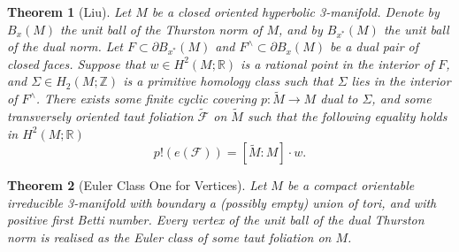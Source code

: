\documentclass[10pt,a4paper]{amsart}
\newtheorem{thm}{Theorem}
\begin{document}
	\begin{thm}[Liu]
		Let $M$ be a closed oriented hyperbolic 3-manifold. Denote by $B_x(M)$ the unit ball of the Thurston norm of $M$, and by $B_{x^*}(M)$ the unit ball of the dual norm. Let $F \subset \partial B_{x^*}(M)$ and $F^\wedge \subset \partial B_x(M)$ be a dual pair of closed faces.  Suppose that $w \in H^2(M ; \mathbb{R})$ is a rational point in the interior of $F$, and $\Sigma \in H_2(M ; \mathbb{Z})$ is a primitive homology class such that $\Sigma$ lies in the interior of $F^\wedge$. 
		There exists some finite cyclic covering $p \colon \tilde{M} \rightarrow M$ dual to $\Sigma$, and some transversely oriented taut foliation $\tilde{\mathcal{F}}$ on $\tilde{M}$ such that the following equality holds in $H^2(M ; \mathbb{R})$
		\[ p!(e(\mathcal{F})) = [\tilde{M}: M] \cdot w. \]
		\label{thm:Liu-virtual-taut foliation-projection}
	\end{thm}

	\begin{thm}[Euler Class One for Vertices]
		Let $M$ be a compact orientable irreducible 3-manifold with boundary a (possibly empty) union of tori, and with positive first Betti number. Every vertex of the unit ball of the dual Thurston norm is realised as the Euler class of some taut foliation on $M$. 
		\label{thm:Gabai-euler class one for vertices}
	\end{thm}
\end{document}
